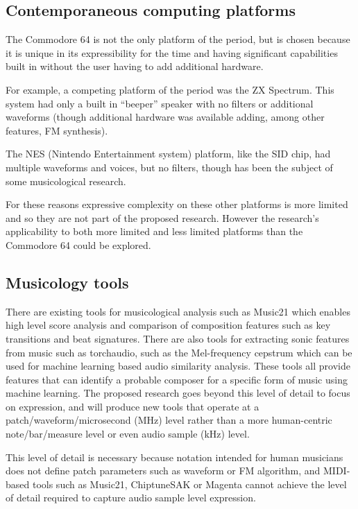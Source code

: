 \documentclass[10pt]{article}
\begin{document}
\begin{multicols*}{2}
\subsection{Contemporaneous computing platforms}

The Commodore 64 is not the only platform of the period, but is chosen because it is unique in its expressibility for the time and having significant capabilities built in without the user having to add additional hardware.

For example, a competing platform of the period was the ZX Spectrum\cite{attrclash}. This system had only a built in “beeper” speaker with no filters or additional waveforms (though additional hardware was available adding, among other features, FM synthesis).

The NES (Nintendo Entertainment system) platform, like the SID chip, had multiple waveforms and voices, but no filters, though has been the subject of some musicological research\cite{nesmusic}.

For these reasons expressive complexity on these other platforms is more limited and so they are not part of the proposed research. However the research's applicability to both more limited and less limited platforms than the Commodore 64 could be explored.

\subsection{Musicology tools}

There are existing tools for musicological analysis such as Music21\cite{music21} which enables high level score analysis and comparison of composition features such as key transitions and beat signatures. There are also tools for extracting sonic features from music such as torchaudio\cite{hwang2023torchaudio}, such as the Mel-frequency cepstrum which can be used for machine learning based audio similarity analysis. These tools all provide features that can identify a probable composer for a specific form of music using machine learning\cite{Yang021-4}. The proposed research goes beyond this level of detail to focus on expression, and will produce new tools that operate at a patch/waveform/microsecond (MHz) level rather than a more human-centric note/bar/measure level or even audio sample (kHz) level.

This level of detail is necessary because notation intended for human musicians does not define patch parameters such as waveform or FM algorithm, and MIDI-based tools such as Music21, ChiptuneSAK\cite{ChiptuneSAK} or Magenta\cite{Magenta} cannot achieve the level of detail required to capture audio sample level expression.


\end{multicols*}
\end{document}
